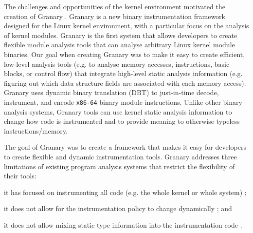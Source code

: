 \documentclass{sigplanconf}
\begin{document}

The challenges and opportunities of the kernel environment motivated the creation of Granary \cite{GranaryAtOSDI,GranaryAtASPLOS}. Granary is a new binary instrumentation framework designed for the Linux kernel environment, with a particular focus on the analysis of kernel modules. Granary is the first system that allows developers to create flexible module analysis tools that can analyse arbitrary Linux kernel module binaries. Our goal when creating Granary was to make it easy to create efficient, low-level analysis tools (e.g. to analyse memory accesses, instructions, basic blocks, or control flow) that integrate high-level static analysis information (e.g. figuring out which data structure fields are associated with each memory access). Granary uses dynamic binary translation (DBT) to just-in-time decode, instrument, and encode \texttt{x86-64} binary module instructions. Unlike other binary analysis systems, Granary tools can use kernel static analysis information to change how code is instrumented and to provide meaning to otherwise typeless instructions/memory. 

The goal of Granary was to create a framework that makes it easy for developers to create flexible and dynamic instrumentation tools. Granary addresses three limitations of existing program analysis systems that restrict the flexibility of their tools: \begin{inparaenum}[(1)]
	\item it has focused on instrumenting all code (e.g. the whole kernel or whole system) \cite{DRK,QEMU,PinOS}; 
	\item it does not allow for the instrumentation policy to change dynamically \cite{Pin,DynamoRIO,QEMU}; and
	\item it does not allow mixing static type information into the instrumentation code  \cite{PinOS,Pin,DRK,DynamoRIO,QEMU}.
\end{inparaenum} 
\end{document}
